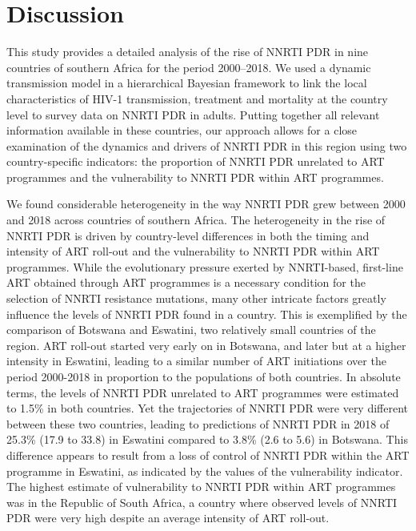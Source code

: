 \documentclass{article}
\begin{document}
\section{Discussion}

This study provides a detailed analysis of the rise of NNRTI PDR in nine countries of southern Africa for the period 2000–2018. We used a dynamic transmission model in a hierarchical Bayesian framework to link the local characteristics of HIV-1 transmission, treatment and mortality at the country level to survey data on NNRTI PDR in adults. Putting together all relevant information available in these countries, our approach allows for a close examination of the dynamics and drivers of NNRTI PDR in this region using two country-specific indicators: the proportion of NNRTI PDR unrelated to ART programmes and the vulnerability to NNRTI PDR within ART programmes.

We found considerable heterogeneity in the way NNRTI PDR grew between 2000 and 2018 across countries of southern Africa. 
The heterogeneity in the rise of NNRTI PDR is driven by country-level differences in both the timing and intensity of ART roll-out and the vulnerability to NNRTI PDR within ART programmes. While the evolutionary pressure exerted by NNRTI-based, first-line ART obtained through ART programmes is a necessary condition for the selection of NNRTI resistance mutations, many other intricate factors greatly influence the levels of NNRTI PDR  found in a country. This is exemplified by the comparison of Botswana and Eswatini, two relatively small countries of the region. ART roll-out started very early on in Botswana, and later but at a higher intensity in Eswatini, leading to a similar number of ART initiations over the period 2000-2018 in proportion to the populations of both countries. In absolute terms, the levels of NNRTI PDR unrelated to ART programmes were estimated to 1.5\% in both countries. Yet the trajectories of NNRTI PDR were very different between these two countries, leading to predictions of NNRTI PDR in 2018 of 25.3\% (17.9 to 33.8) in Eswatini  compared to 3.8\% (2.6 to 5.6) in Botswana. This difference appears to result from a loss of control of NNRTI PDR within the ART programme in Eswatini, as indicated by the values of the vulnerability indicator. The highest estimate of  vulnerability to NNRTI PDR within ART programmes was in the Republic of South Africa, a country where observed levels of NNRTI PDR were very high despite an average intensity of ART roll-out.
\end{document}
